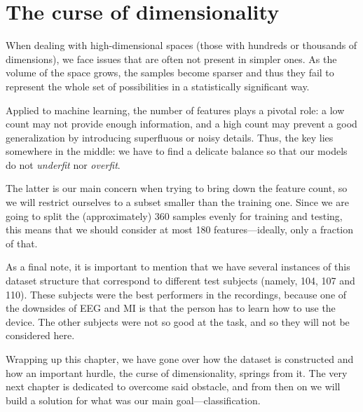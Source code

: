 \newpage

\section{The curse of dimensionality} 

	When dealing with high-dimensional spaces (those with hundreds or thousands of dimensions), we face issues that are often not present in simpler ones. As the volume of the space grows, the samples become sparser and thus they fail to represent the whole set of possibilities in a statistically significant way.

	Applied to machine learning, the number of features plays a pivotal role: a low count may not provide enough information, and a high count may prevent a good generalization by introducing superfluous or noisy details. Thus, the key lies somewhere in the middle: we have to find a delicate balance so that our models do not \textit{underfit} nor \textit{overfit}. 

	The latter is our main concern when trying to bring down the feature count, so we will restrict ourselves to a subset smaller than the training one. Since we are going to split the (approximately) 360 samples evenly for training and testing, this means that we should consider at most 180 features---ideally, only a fraction of that.

	As a final note, it is important to mention that we have several instances of this dataset structure that correspond to different test subjects (namely, 104, 107 and 110). These subjects were the best performers in the recordings, because one of the downsides of \acs{EEG} and \acs{MI} is that the person has to learn how to use the device. The other subjects were not so good at the task, and so they will not be considered here.

Wrapping up this chapter, we have gone over how the dataset is constructed and how an important hurdle, the curse of dimensionality, springs from it. The very next chapter is dedicated to overcome said obstacle, and from then on we will build a solution for what was our main goal---classification.